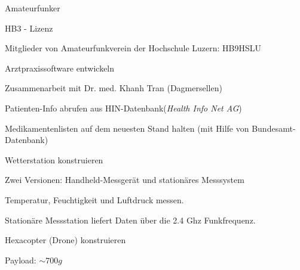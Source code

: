 

\begin{cventries}

	\cventry
	{} %
	{Amateurfunker} %
	{} %
	{} %
	{\vspace{-12pt}
		\begin{cvitems} %
			\item {HB3 - Lizenz}
			\item {Mitglieder von Amateurfunkverein der Hochschule Luzern: HB9HSLU}
		\end{cvitems}
	}
	
	\cventry
	{} %
	{Arztpraxissoftware entwickeln} %
	{} %
	{} %
	{\vspace{-12pt}
		\begin{cvitems} %
			\item {Zusammenarbeit mit Dr. med. Khanh Tran (Dagmersellen)}
			\item {Patienten-Info abrufen aus HIN-Datenbank(\textit{Health Info Net AG})}
			\item {Medikamentenlisten auf dem neuesten Stand halten (mit Hilfe von Bundesamt-Datenbank)}
		\end{cvitems}
	}
	
	\cventry
	{} %
	{Wetterstation konstruieren} %
	{} %
	{} %
	{\vspace{-12pt}
		\begin{cvitems} %
			\item {Zwei Versionen: Handheld-Messgerät und stationäres Messsystem}
			\item {Temperatur, Feuchtigkeit und Luftdruck messen.}
			\item {Stationäre Messstation liefert Daten über die 2.4 Ghz Funkfrequenz.}
		\end{cvitems}
	}
	
	\cventry
	{} %
	{Hexacopter (Drone) konstruieren} %
	{} %
	{} %
	{\vspace{-12pt}
		\begin{cvitems} %
			\item {Payload: $ \sim 700g$}
		\end{cvitems}
	}
	

\end{cventries}
